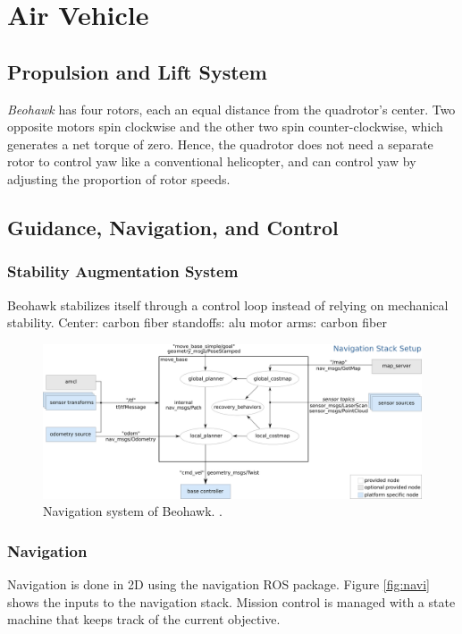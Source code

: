 \documentclass[12pt, letterpaper]{article}
\begin{document}
\section{Air Vehicle}

\subsection{Propulsion and Lift System}
\emph{Beohawk} has four rotors, each an equal distance from the quadrotor's center.  Two opposite motors spin clockwise and the other two spin counter-clockwise, which generates a net torque of zero.  Hence, the quadrotor does not need a separate rotor to control yaw like a conventional helicopter, and can control yaw by adjusting the proportion of rotor speeds.  

\subsection{Guidance, Navigation, and Control}

\subsubsection{Stability Augmentation System}
Beohawk stabilizes itself through a control loop instead of relying on mechanical stability. 
Center: carbon fiber
standoffs: alu
motor arms: carbon fiber

\begin{figure}[h]
\centering
\includegraphics[width=12cm]{images/overview_tf.png}
\caption{Navigation system of Beohawk. .} 
\label{fig:navi}
\end{figure}

\subsubsection{Navigation}
Navigation is done in 2D using the navigation ROS package. Figure \eqref{fig:navi} shows the inputs to the navigation stack. Mission control is managed with a state machine that keeps track of the current objective.  
\end{document}

